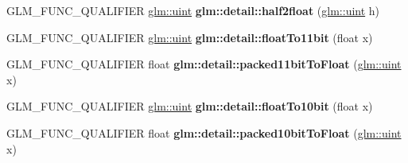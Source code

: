 \begin{DoxyCompactItemize}
\item 
G\+L\+M\+\_\+\+F\+U\+N\+C\+\_\+\+Q\+U\+A\+L\+I\+F\+I\+ER \hyperlink{group__core__precision_ga4fd29415871152bfb5abd588334147c8}{glm\+::uint} {\bfseries glm\+::detail\+::half2float} (\hyperlink{group__core__precision_ga4fd29415871152bfb5abd588334147c8}{glm\+::uint} h)\hypertarget{packing_8inl_a69b64ab4be52c9601b31588c8c813ca0}{}\label{packing_8inl_a69b64ab4be52c9601b31588c8c813ca0}

\item 
G\+L\+M\+\_\+\+F\+U\+N\+C\+\_\+\+Q\+U\+A\+L\+I\+F\+I\+ER \hyperlink{group__core__precision_ga4fd29415871152bfb5abd588334147c8}{glm\+::uint} {\bfseries glm\+::detail\+::float\+To11bit} (float x)\hypertarget{packing_8inl_a62edbdbe89fe6282dd7909e6e4703796}{}\label{packing_8inl_a62edbdbe89fe6282dd7909e6e4703796}

\item 
G\+L\+M\+\_\+\+F\+U\+N\+C\+\_\+\+Q\+U\+A\+L\+I\+F\+I\+ER float {\bfseries glm\+::detail\+::packed11bit\+To\+Float} (\hyperlink{group__core__precision_ga4fd29415871152bfb5abd588334147c8}{glm\+::uint} x)\hypertarget{packing_8inl_a0148d59bbb6dbf6c0f296e73a527c225}{}\label{packing_8inl_a0148d59bbb6dbf6c0f296e73a527c225}

\item 
G\+L\+M\+\_\+\+F\+U\+N\+C\+\_\+\+Q\+U\+A\+L\+I\+F\+I\+ER \hyperlink{group__core__precision_ga4fd29415871152bfb5abd588334147c8}{glm\+::uint} {\bfseries glm\+::detail\+::float\+To10bit} (float x)\hypertarget{packing_8inl_a2be3138712a0811602a183614221ad5c}{}\label{packing_8inl_a2be3138712a0811602a183614221ad5c}

\item 
G\+L\+M\+\_\+\+F\+U\+N\+C\+\_\+\+Q\+U\+A\+L\+I\+F\+I\+ER float {\bfseries glm\+::detail\+::packed10bit\+To\+Float} (\hyperlink{group__core__precision_ga4fd29415871152bfb5abd588334147c8}{glm\+::uint} x)\hypertarget{packing_8inl_afddea7fa02b61b01129777a21380edf4}{}\label{packing_8inl_afddea7fa02b61b01129777a21380edf4}


\end{DoxyCompactItemize}
